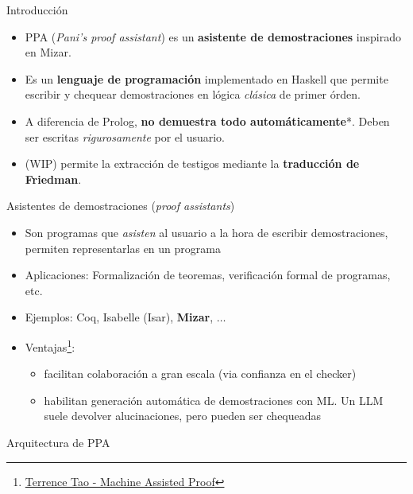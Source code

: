 \documentclass{beamer}
\begin{document}
\begin{frame}{Introducción}
    \begin{itemize}
        \item PPA (\textit{Pani's proof assistant}) es un \textbf{asistente de demostraciones} inspirado en Mizar.
        \item Es un \textbf{lenguaje de programación} implementado en Haskell que permite escribir y chequear demostraciones en lógica \textit{clásica} de primer órden.
        \item A diferencia de Prolog, \textbf{no demuestra todo automáticamente}*. Deben ser escritas \textit{rigurosamente} por el usuario.
        \item (WIP) permite la extracción de testigos mediante la \textbf{traducción de Friedman}.
    \end{itemize}
\end{frame}

\begin{frame}{Asistentes de demostraciones (\textit{proof assistants})}
    \begin{itemize}
        \item Son programas que \textit{asisten} al usuario a la hora de escribir demostraciones, permiten representarlas en un programa
        \item Aplicaciones: Formalización de teoremas, verificación formal de programas, etc.
        \item Ejemplos: Coq, Isabelle (Isar), \textbf{Mizar}, $\dots$
        \item Ventajas\footnote{\href{https://youtu.be/AayZuuDDKP0?si=eGETzgh9PQ_8JecR}{Terrence Tao - Machine Assisted Proof}}:
        \begin{itemize}
            \item facilitan colaboración a gran escala (via confianza en el checker)
            \item habilitan generación automática de demostraciones con ML. Un LLM suele devolver alucinaciones, pero pueden ser chequeadas
        \end{itemize}
        
    \end{itemize}
\end{frame}



\begin{frame}{Arquitectura de PPA}

\begin{figure}
    \centering
\end{figure}

\end{frame}
\end{document}
